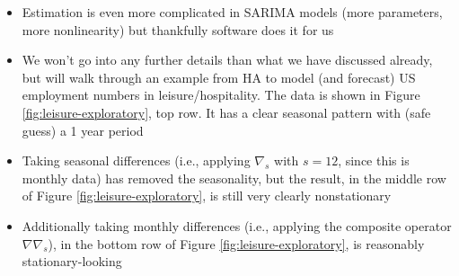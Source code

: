 \documentclass{article}
\begin{document}
\begin{itemize}
\item Estimation is even more complicated in SARIMA models (more parameters, 
  more nonlinearity) but thankfully software does it for us

\item We won't go into any further details than what we have discussed already,
  but will walk through an example from HA to model (and forecast) US
  employment numbers in leisure/hospitality. The data is shown in Figure
  \ref{fig:leisure-exploratory}, top row. It has a clear seasonal pattern with
  (safe guess) a 1 year period  

\item Taking seasonal differences (i.e., applying $\nabla_s$ with $s = 12$,
  since this is monthly data) has removed the seasonality, but the result, in
  the middle row of Figure \ref{fig:leisure-exploratory}, is still very clearly
  nonstationary   

\item Additionally taking monthly differences (i.e., applying the composite 
  operator $\nabla \nabla_s$), in the bottom row of Figure
  \ref{fig:leisure-exploratory}, is reasonably stationary-looking    


\end{itemize}
\end{document}
